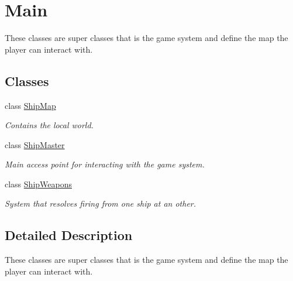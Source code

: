 \hypertarget{group__main}{\section{Main}
\label{group__main}
}


These classes are super classes that is the game system and define the map the player can interact with.  


\subsection*{Classes}
\begin{DoxyCompactItemize}
\item 
class \hyperlink{classShipMap}{Ship\-Map}
\begin{DoxyCompactList}\small\item\em Contains the local world. \end{DoxyCompactList}\item 
class \hyperlink{classShipMaster}{Ship\-Master}
\begin{DoxyCompactList}\small\item\em Main access point for interacting with the game system. \end{DoxyCompactList}\item 
class \hyperlink{classShipWeapons}{Ship\-Weapons}
\begin{DoxyCompactList}\small\item\em System that resolves firing from one ship at an other. \end{DoxyCompactList}\end{DoxyCompactItemize}


\subsection{Detailed Description}
These classes are super classes that is the game system and define the map the player can interact with. 